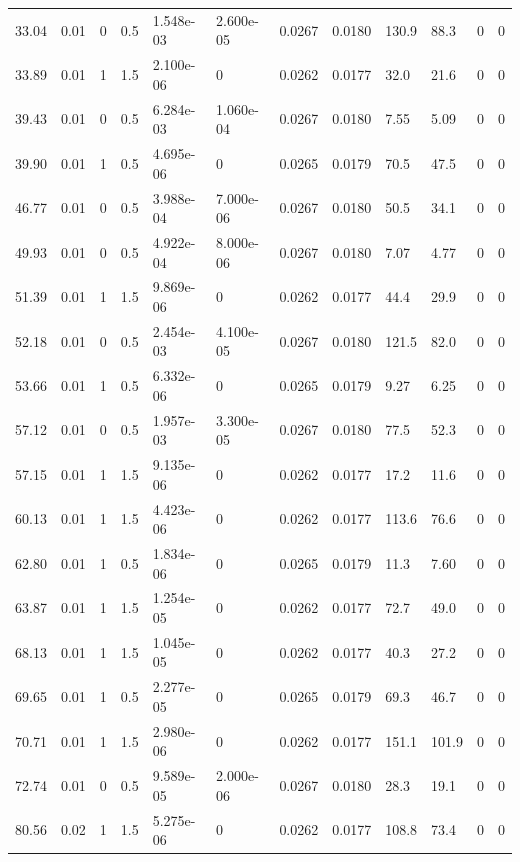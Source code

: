 \documentclass[preview]{standalone}
\begin{document}
{{\begin{tabular}{L{1.2cm}C{1.2cm} C{0.3cm}C{0.5cm} C{1.4cm}C{1.4cm} C{1.4cm}C{1.4cm} C{1.6cm}C{1.6cm} C{1.6cm}C{1.6cm}}
  33.04  &  0.01  & 0     & 0.5 &  1.548e-03  & 2.600e-05  &  0.0267&   0.0180& 130.9 & 88.3   &  0 & 0  \\ 
  33.89  &  0.01  & 1     & 1.5 &  2.100e-06  & 0  &  0.0262&   0.0177& 32.0 & 21.6   &  0 & 0  \\ 
  39.43  &  0.01  & 0     & 0.5 &  6.284e-03  & 1.060e-04  &  0.0267&   0.0180& 7.55 & 5.09   &  0 & 0  \\ 
  39.90  &  0.01  & 1     & 0.5 &  4.695e-06  & 0  &  0.0265&   0.0179& 70.5 & 47.5   &  0 & 0  \\ 
  46.77  &  0.01  & 0     & 0.5 &  3.988e-04  & 7.000e-06  &  0.0267&   0.0180& 50.5 & 34.1   &  0 & 0  \\ 
  49.93  &  0.01  & 0     & 0.5 &  4.922e-04  & 8.000e-06  &  0.0267&   0.0180& 7.07 & 4.77   &  0 & 0  \\ 
  51.39  &  0.01  & 1     & 1.5 &  9.869e-06  & 0  &  0.0262&   0.0177& 44.4 & 29.9   &  0 & 0  \\ 
  52.18  &  0.01  & 0     & 0.5 &  2.454e-03  & 4.100e-05  &  0.0267&   0.0180& 121.5 & 82.0   &  0 & 0  \\ 
  53.66  &  0.01  & 1     & 0.5 &  6.332e-06  & 0  &  0.0265&   0.0179& 9.27 & 6.25   &  0 & 0  \\ 
  57.12  &  0.01  & 0     & 0.5 &  1.957e-03  & 3.300e-05  &  0.0267&   0.0180& 77.5 & 52.3   &  0 & 0  \\ 
  57.15  &  0.01  & 1     & 1.5 &  9.135e-06  & 0  &  0.0262&   0.0177& 17.2 & 11.6   &  0 & 0  \\ 
  60.13  &  0.01  & 1     & 1.5 &  4.423e-06  & 0  &  0.0262&   0.0177& 113.6 & 76.6   &  0 & 0  \\ 
  62.80  &  0.01  & 1     & 0.5 &  1.834e-06  & 0  &  0.0265&   0.0179& 11.3 & 7.60   &  0 & 0  \\ 
  63.87  &  0.01  & 1     & 1.5 &  1.254e-05  & 0  &  0.0262&   0.0177& 72.7 & 49.0   &  0 & 0  \\ 
  68.13  &  0.01  & 1     & 1.5 &  1.045e-05  & 0  &  0.0262&   0.0177& 40.3 & 27.2   &  0 & 0  \\ 
  69.65  &  0.01  & 1     & 0.5 &  2.277e-05  & 0  &  0.0265&   0.0179& 69.3 & 46.7   &  0 & 0  \\ 
  70.71  &  0.01  & 1     & 1.5 &  2.980e-06  & 0  &  0.0262&   0.0177& 151.1 & 101.9   &  0 & 0  \\ 
  72.74  &  0.01  & 0     & 0.5 &  9.589e-05  & 2.000e-06  &  0.0267&   0.0180& 28.3 & 19.1   &  0 & 0  \\ 
  80.56  &  0.02  & 1     & 1.5 &  5.275e-06  & 0  &  0.0262&   0.0177& 108.8 & 73.4   &  0 & 0  \\ 

\end{tabular}}}
\end{document}
